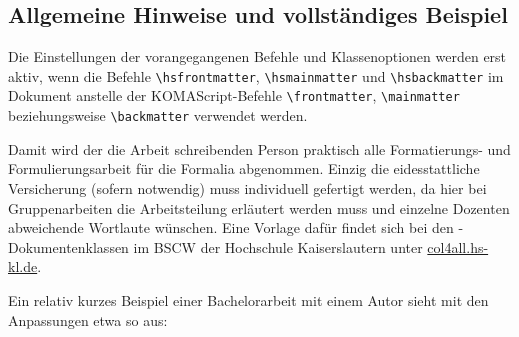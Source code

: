 \subsection{Allgemeine Hinweise und vollständiges Beispiel}
Die Einstellungen der vorangegangenen Befehle und Klassenoptionen werden erst
aktiv, wenn die Befehle
\verb!\hsfrontmatter!, \verb!\hsmainmatter! und \verb!\hsbackmatter!
im Dokument anstelle der KOMAScript-Befehle \verb!\frontmatter!,
\verb!\mainmatter! beziehungsweise \verb!\backmatter! verwendet werden.

Damit wird der die Arbeit schreibenden Person praktisch alle Formatierungs- und
Formulierungsarbeit für die Formalia abgenommen. Einzig die eidesstattliche
Versicherung (sofern notwendig) muss individuell gefertigt werden, da hier
bei Gruppenarbeiten die Arbeitsteilung erläutert werden muss und einzelne
Dozenten abweichende Wortlaute wünschen.
Eine Vorlage dafür findet sich bei den \HSKL-Dokumentenklassen im BSCW der
Hochschule Kaiserslautern unter \url{col4all.hs-kl.de}.

Ein relativ kurzes Beispiel einer Bachelorarbeit mit einem Autor sieht mit den
Anpassungen etwa so aus:

